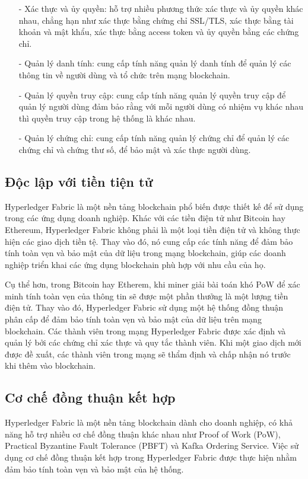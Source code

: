 \begin{itemize}
    \item[-] Xác thực và ủy quyền: hỗ trợ nhiều phương thức xác thực và ủy quyền khác nhau, 
    chẳng hạn như xác thực bằng chứng chỉ SSL/TLS, xác thực bằng tài khoản và mật khẩu, 
    xác thực bằng access token và ủy quyền bằng các chứng chỉ.
    \item[-] Quản lý danh tính: cung cấp tính năng quản lý danh tính để quản lý các thông tin
    về người dùng và tổ chức trên mạng blockchain.
    \item[-] Quản lý quyền truy cập: cung cấp tính năng quản lý quyền truy cập để quản lý 
    người dùng đảm bảo rằng với mỗi người dùng có nhiệm vụ khác nhau thì quyền truy cập trong
    hệ thống là khác nhau.
    \item[-] Quản lý chứng chỉ: cung cấp tính năng quản lý chứng chỉ để quản lý các chứng chỉ
    và chứng thư số, để bảo mật và xác thực người dùng. \cite{hyperledger}

\end{itemize}
\subsection{Độc lập với tiền tiện tử}

Hyperledger Fabric là một nền tảng blockchain phổ biến được thiết kế để sử dụng trong các 
ứng dụng doanh nghiệp. Khác với các tiền điện tử như Bitcoin hay Ethereum, Hyperledger 
Fabric không phải là một loại tiền điện tử và không thực hiện các giao dịch tiền tệ. Thay 
vào đó, nó cung cấp các tính năng để đảm bảo tính toàn vẹn và bảo mật của dữ liệu trong 
mạng blockchain, giúp các doanh nghiệp triển khai các ứng dụng blockchain phù hợp với nhu 
cầu của họ.

Cụ thể hơn, trong Bitcoin hay Etherem, khi miner giải bài toán khó PoW để xác minh tính
toàn vẹn của thông tin sẽ được một phần thưởng là một lượng tiền điện tử. Thay vào đó, Hyperledger Fabric
sử dụng một hệ thống đồng thuận phân cấp để đảm bảo tính toàn vẹn và bảo mật của dữ liệu 
trên mạng blockchain. Các thành viên trong mạng Hyperledger Fabric được xác định và quản 
lý bởi các chứng chỉ xác thực và quy tắc thành viên. Khi một giao dịch mới được đề xuất, 
các thành viên trong mạng sẽ thẩm định và chấp nhận nó trước khi thêm vào blockchain.

\subsection{Cơ chế đồng thuận kết hợp}
Hyperledger Fabric là một nền tảng blockchain dành cho doanh nghiệp, có khả năng hỗ trợ 
nhiều cơ chế đồng thuận khác nhau như Proof of Work (PoW), Practical Byzantine Fault 
Tolerance (PBFT) và Kafka Ordering Service. Việc sử dụng cơ chế đồng thuận kết hợp trong 
Hyperledger Fabric được thực hiện nhằm đảm bảo tính toàn vẹn và bảo mật của hệ thống. 

